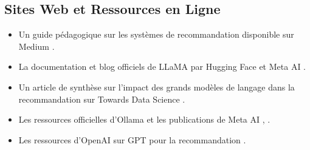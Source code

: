 \subsection*{Sites Web et Ressources en Ligne}
\begin{itemize}[leftmargin=1.5cm]
    \item Un guide pédagogique sur les systèmes de recommandation disponible sur Medium \cite{medium2023recommendation}.
    \item La documentation et blog officiels de LLaMA par Hugging Face \cite{huggingface2023llama} et Meta AI \cite{meta2023llama}.
    \item Un article de synthèse sur l'impact des grands modèles de langage dans la recommandation sur Towards Data Science \cite{towardsdatascience2023}.
    \item Les ressources officielles d'Ollama \cite{liu2023ollama} et les publications de Meta AI \cite{tang2023llama}, \cite{gao2023llama}.
    \item Les ressources d'OpenAI sur GPT pour la recommandation \cite{radford2023gpt}.
\end{itemize}

